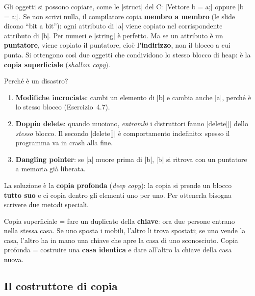 Gli oggetti si possono copiare, come le \cc|struct| del C: \cc|Vettore b = a;|
oppure \cc|b = a;|. Se non scrivi nulla, il compilatore copia \textbf{membro a
membro} (le slide dicono ``bit a bit''): ogni attributo di \cc|a| viene copiato
nel corrispondente attributo di \cc|b|. Per numeri e \cc|string| è perfetto.
Ma se un attributo è un \textbf{puntatore}, viene copiato il puntatore, cioè
\textbf{l'indirizzo}, non il blocco a cui punta. Si ottengono così due oggetti che
condividono lo stesso blocco di heap: è la \textbf{copia superficiale}
(\emph{shallow copy}).

Perché è un disastro?
\begin{enumerate}
  \item \textbf{Modifiche incrociate}: cambi un elemento di \cc|b| e cambia anche
        \cc|a|, perché è lo stesso blocco (Esercizio~4.7).
  \item \textbf{Doppio delete}: quando muoiono, \emph{entrambi} i distruttori fanno
        \cc|delete[]| dello \emph{stesso} blocco. Il secondo \cc|delete[]| è
        comportamento indefinito: spesso il programma va in crash alla fine.
  \item \textbf{Dangling pointer}: se \cc|a| muore prima di \cc|b|, \cc|b| si
        ritrova con un puntatore a memoria già liberata.
\end{enumerate}
La soluzione è la \textbf{copia profonda} (\emph{deep copy}): la copia si prende
un blocco \textbf{tutto suo} e ci copia dentro gli elementi uno per uno. Per
ottenerla bisogna scrivere due metodi speciali.

\begin{analogia}
Copia superficiale = fare un duplicato della \textbf{chiave}: ora due persone
entrano nella stessa casa. Se uno sposta i mobili, l'altro li trova spostati; se
uno vende la casa, l'altro ha in mano una chiave che apre la casa di uno
sconosciuto. Copia profonda = costruire una \textbf{casa identica} e dare
all'altro la chiave della casa nuova.
\end{analogia}

\subsection*{Il costruttore di copia}

